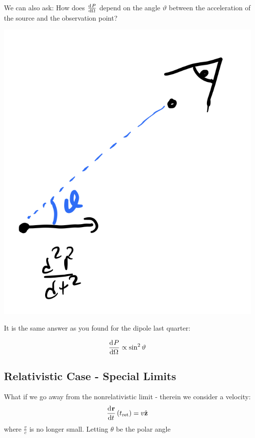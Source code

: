 We can also ask: How does $\od{P}{\Omega}$ depend on the angle $\vartheta$ between the acceleration of the source and the observation point? 

\begin{center}
    \includegraphics[scale=0.38]{Lectures/Images/lec9-accelangle.png}
\end{center}

It is the same answer as you found for the dipole last quarter:

\begin{equation}
    \dod{P}{\Omega} \propto \sin^2\vartheta
\end{equation}

\subsection{Relativistic Case - Special Limits}
What if we go away from the nonrelativistic limit - therein we consider a velocity:
\begin{equation}
    \dod{\v{r}}{t}(t_{\text{ret}}) = v\zhat
\end{equation}
where $\frac{v}{c}$ is no longer small. Letting $\theta$ be the polar angle

